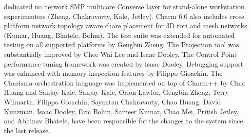 dedicated no network SMP multicore Converse layer for stand-alone
workstation experimenters (Zheng, Chakravorty, Kale, Jetley).
Charm 6.0 also includes cross platform network topology aware
chare placement for 3D tori and mesh networks (Kumar, Huang,
Bhatele, Bohm). The test suite was extended for automated testing
on all supported platforms by Gengbin Zheng.  The Projection tool
was substantially improved by Chee Wai Lee and Isaac Dooley. The
Control Point performance tuning framework was created by Isaac
Dooley. Debugging support was enhanced with memory inspection
features by Filippo Gioachin. The Charisma orchestration language
was implemented on top of Charm++ by Chao Huang and Sanjay Kale.
Sanjay Kale, Orion Lawlor, Gengbin Zheng, Terry Wilmarth, Filippo
Gioachin, Sayantan Chakravorty, Chao Huang, David Kunzman, Isaac
Dooley, Eric Bohm, Sameer Kumar, Chao Mei, Pritish Jetley, and
Abhinav Bhatele, have been responsible for the changes to the
system since the last release. 
